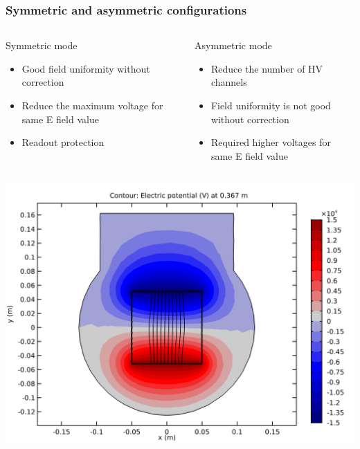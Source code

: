 \begin{frame}[t]
  \frametitle{Symmetric and asymmetric configurations}
  \begin{columns}[T]
    \begin{column}{0.45\textwidth}
      \begin{block}{Symmetric mode}
        \begin{itemize}
          \item Good field uniformity without correction
          \item Reduce the maximum voltage for same E field value
          \item Readout protection
        \end{itemize}
      \end{block}
    \end{column}
    \begin{column}{0.45\textwidth}
      \begin{block}{Asymmetric mode}
        \begin{itemize}
          \item Reduce the number of HV channels
          \item Field uniformity is not good without correction
          \item Required higher voltages for same E field value
        \end{itemize}
      \end{block}
    \end{column}
  \end{columns}
  \begin{columns}[T]
    \centering
    \begin{column}{0.45\textwidth}
      \centering
      \includegraphics[width=1\textwidth]{06_Backup/fig/fig021_image_asym_sym_b}

\end{column}
\end{columns}
\end{frame}
